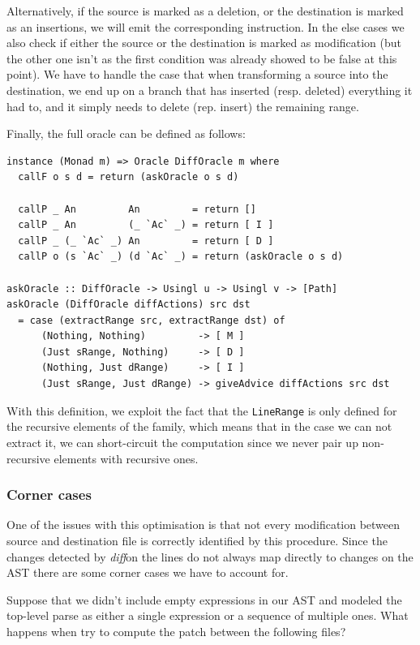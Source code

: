 \documentclass[11pt, titlepage]{article}
\newcommand{\toHaskell}[1]{\texttt{#1}\xspace}
\newcommand{\diff}{\emph{diff}}
\begin{document}
Alternatively, if the source is marked as a deletion, or the destination is marked as an insertions, we will emit the corresponding instruction.
In the else cases we also check if either the source or the destination is marked as modification (but the other one isn't as the first condition was already showed to be false at this point). We have to handle the case that when transforming a source into the destination, we end up on a branch that has inserted (resp. deleted) everything it had to, and it simply needs to delete (rep. insert) the remaining range.


Finally, the full oracle can be defined as follows:

\begin{verbatim}
instance (Monad m) => Oracle DiffOracle m where
  callF o s d = return (askOracle o s d)

  callP _ An         An         = return []
  callP _ An         (_ `Ac` _) = return [ I ]
  callP _ (_ `Ac` _) An         = return [ D ]
  callP o (s `Ac` _) (d `Ac` _) = return (askOracle o s d)

askOracle :: DiffOracle -> Usingl u -> Usingl v -> [Path]
askOracle (DiffOracle diffActions) src dst 
  = case (extractRange src, extractRange dst) of
      (Nothing, Nothing)         -> [ M ]
      (Just sRange, Nothing)     -> [ D ]
      (Nothing, Just dRange)     -> [ I ]
      (Just sRange, Just dRange) -> giveAdvice diffActions src dst
\end{verbatim}

With this definition, we exploit the fact that the \toHaskell{LineRange} is only defined for the recursive elements of the family, which means that in the case we can not extract it, we can short-circuit the computation since we never pair up non-recursive elements with recursive ones.

\subsubsection{Corner cases}

One of the issues with this optimisation is that not every modification between source and destination file is correctly identified by this procedure. Since the changes detected by \diff on the lines do not always map directly to changes on the AST there are some corner cases we have to account for.

Suppose that we didn't include empty expressions in our AST and modeled the top-level parse as either a single expression or a sequence of multiple ones. 
What happens when try to compute the patch between the following files?
\end{document}
